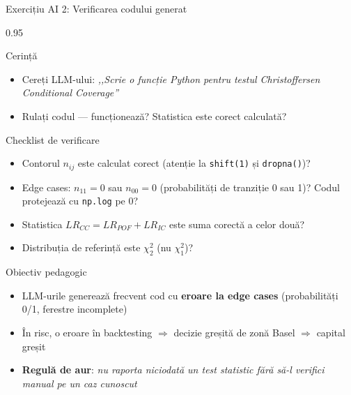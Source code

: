 \documentclass[9pt, aspectratio=169, t]{beamer}
\begin{document}
\begin{frame}[shrink=10]{Exercițiu AI 2: Verificarea codului generat}
\begin{cminipage}{0.95\textwidth}
    \begin{block}{Cerință}
    \begin{itemize}\setlength{\itemsep}{0pt}
        \item Cereți LLM-ului: \textit{,,Scrie o funcție Python pentru testul Christoffersen Conditional Coverage''}
        \item Rulați codul --- funcționează? Statistica este corect calculată?
    \end{itemize}
    \end{block}
    \vspace{0.1cm}
    \begin{alertblock}{Checklist de verificare}
    \begin{itemize}\setlength{\itemsep}{0pt}
        \item Contorul $n_{ij}$ este calculat corect (atenție la \texttt{shift(1)} și \texttt{dropna()})?
        \item Edge cases: $n_{11} = 0$ sau $n_{00} = 0$ (probabilități de tranziție 0 sau 1)? Codul protejează cu \texttt{np.log} pe 0?
        \item Statistica $LR_{CC} = LR_{POF} + LR_{IC}$ este suma corectă a celor două?
        \item Distribuția de referință este $\chi^2_2$ (nu $\chi^2_1$)?
    \end{itemize}
    \end{alertblock}
    \vspace{0.1cm}
    \begin{exampleblock}{Obiectiv pedagogic}
    \begin{itemize}\setlength{\itemsep}{0pt}
        \item LLM-urile generează frecvent cod cu \textbf{eroare la edge cases} (probabilități 0/1, ferestre incomplete)
        \item În risc, o eroare în backtesting $\Rightarrow$ decizie greșită de zonă Basel $\Rightarrow$ capital greșit
        \item \textbf{Regulă de aur}: \textit{nu raporta niciodată un test statistic fără să-l verifici manual pe un caz cunoscut}
    \end{itemize}
    \end{exampleblock}
\end{cminipage}
\end{frame}
\end{document}
